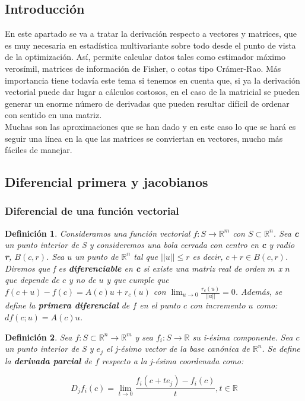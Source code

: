 \documentclass{article}
\theoremstyle{theorem-style}  %
\theoremstyle{definition-style}
\newtheorem{definition}{Definición}[section]
\theoremstyle{example-style}
\theoremstyle{exercise-style}
\begin{document}
	\subsection{Introducción}
	
	En este apartado se va a tratar la derivación respecto a vectores y matrices, que es muy necesaria en estadística multivariante sobre todo desde el punto de vista de la optimización. Así, permite calcular datos tales como estimador máximo verosímil, matrices de información de Fisher, o cotas tipo Crámer-Rao. Más importancia tiene todavía este tema si tenemos en cuenta que, si ya la derivación vectorial puede dar lugar a cálculos costosos, en el caso de la matricial se pueden generar un enorme número de derivadas que pueden resultar difícil de ordenar con sentido en una matriz. \\
	
	Muchas son las aproximaciones que se han dado y en este caso lo que se hará es seguir una línea en la que las matrices se conviertan en vectores, mucho más fáciles de manejar.
	
	\subsection{Diferencial primera y jacobianos}
	
	\subsubsection{Diferencial de una función vectorial}
	
	\begin{definition}
		Consideramos una función vectorial $f: S \rightarrow \mathbb{R}^m$ con $S\subset \mathbb{R}^n$. Sea \textbf{c} un punto interior de S y consideremos una bola cerrada con centro en \textbf{c} y radio \textbf{r}, $B(c,r)$. Sea $u$ un punto de $\mathbb{R}^n$ tal que $||u||\leq r$ es decir, $c+r \in B(c,r)$.\\ 
		Diremos que f es \textbf{diferenciable} en \textbf{c} si existe una matriz real de orden $m$ x $n$ que depende de $c$ y no de $u$ y que cumple que $f(c+u)-f(c) = A(c)u + r_c(u)$ con $\lim_{u\to0} \frac{r_c(u)}{||u||} = 0$. Además, se define la \textbf{primera diferencial} de $f$ en el punto $c$ con incremento $u$ como: $df(c;u)=A(c)u$.
	\end{definition}
	
	\begin{definition}
		
		Sea $f: S\subset \mathbb{R}^n \rightarrow \mathbb{R}^m$ y sea $f_i: S \rightarrow \mathbb{R}$ su i-ésima componente. Sea $c$ un punto interior de S y $e_j$ el j-ésimo vector de la base canónica de $\mathbb{R}^n$. Se define la \textbf{derivada parcial} de $f$ respecto a la j-ésima coordenada como: 
		
		$$ D_jf_i(c) = \lim_{t\to0} \frac{f_i(c + te_j ) - f_i(c)}{t}, t\in \mathbb{R} $$  
	\end{definition}
	
\end{document}
